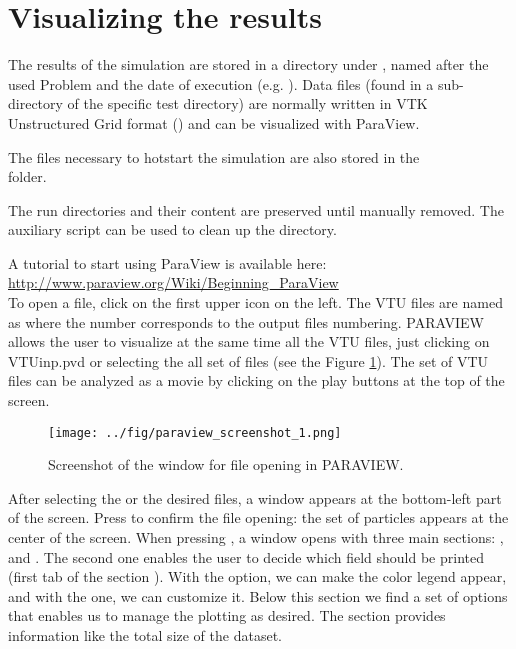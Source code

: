 \documentclass{../GPUSPHtemplate}
\begin{document}
\section{Visualizing the results}\label{sec:postprocess}

The results of the simulation are stored in a directory under
, named after the used Problem and the date of execution
(e.g. ). Data files (found in a
 sub-directory of the specific test directory) are normally
written in VTK Unstructured Grid format () and can be
visualized with ParaView.

The files necessary to hotstart the simulation are also stored
in the \\  folder.

The run directories and their content are preserved until manually
removed. The  auxiliary script can be used to clean
up the  directory.

A tutorial to start using ParaView is available here:\\
\url{http://www.paraview.org/Wiki/Beginning_ParaView}\\

To open a file, click on the first upper icon on the left. 
The VTU files are named as  where the number corresponds to
the output files numbering. 
PARAVIEW allows the user to visualize at the same time all the VTU files, 
just clicking on VTUinp.pvd or selecting the all set of  files
(see the Figure \ref{fig:paraview_screenshot_1}).
The set of VTU files can be analyzed as a movie by clicking on 
the play buttons at the top of the screen. 

\begin{figure}[h]
  \begin{center}
    \texttt{[image: ../fig/paraview\_screenshot\_1.png]}
    \caption{Screenshot of the window for file opening in PARAVIEW.}\label{fig:paraview_screenshot_1}   
  \end{center}
\end{figure}
After selecting the  or the desired  files, 
a window appears at the bottom-left part of the screen. 
Press  to confirm the file opening: the set of particles
appears at the center of the screen.
When pressing , a window opens with three main sections: 
,  and . 
The second one enables the user to decide which field should be printed 
(first tab of the section ). 
With the  option, we can make the color legend appear, 
and with the  one, we can customize it. 
Below this section we find a set of options that enables us to manage the plotting as desired.
The  section provides information like the total size of the dataset.\\
\end{document}
